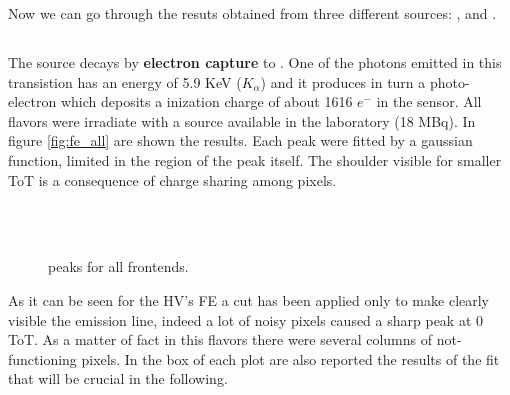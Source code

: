 Now we can go through the resuts obtained from three different sources: ,  and .
\subsection{}

The  source decays by \textbf{electron capture} to . One of the photons emitted in this transistion has an energy of 5.9 KeV ($K_{\alpha}$) and it produces in turn a photo-electron which deposits a inization charge of about 1616 $e^{-}$ in the sensor. 
All flavors were irradiate with a  source available in the laboratory (18 MBq). In figure \vref{fig:fe_all} are shown the results. Each peak were fitted by a gaussian function, limited in the region of the peak itself. The shoulder visible for smaller ToT is a consequence of charge sharing among pixels. 

\begin{figure}[h!]
\centering
{}\quad
{}\\
\quad
{}\\
\caption{ peaks for all frontends.}
\label{fig:fe_all}
\end{figure}

As it can be seen for the HV's FE a cut has been applied only to make clearly visible the emission line, indeed a lot of noisy pixels caused a sharp peak at 0 ToT. As a matter of fact in this flavors there were several columns of not-functioning pixels. In the box of each plot are also reported the results of the fit that will be crucial in the following.


\subsection{}


